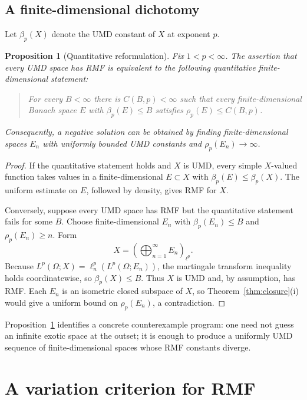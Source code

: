 \documentclass[11pt]{article}
\newtheorem{proposition}[theorem]{Proposition}
\theoremstyle{definition}
\newcommand{\1}{\mathbf 1}
\begin{document}
\subsection{A finite-dimensional dichotomy}

Let $\beta_p(X)$ denote the UMD constant of $X$ at exponent $p$.

\begin{proposition}[Quantitative reformulation]\label{prop:finite-dichotomy}
Fix $1<p<\infty$.  The assertion that every UMD space has RMF is equivalent to
the following quantitative finite-dimensional statement:
\begin{quote}
For every $B<\infty$ there is $C(B,p)<\infty$ such that every
finite-dimensional Banach space $E$ with $\beta_p(E)\le B$ satisfies
$\rho_p(E)\le C(B,p)$.
\end{quote}
Consequently, a negative solution can be obtained by finding finite-dimensional
spaces $E_n$ with uniformly bounded UMD constants and
$\rho_p(E_n)\to\infty$.
\end{proposition}

\begin{proof}
If the quantitative statement holds and $X$ is UMD, every simple $X$-valued
function takes values in a finite-dimensional $E\subset X$ with
$\beta_p(E)\le\beta_p(X)$.  The uniform estimate on $E$, followed by density,
gives RMF for $X$.

Conversely, suppose every UMD space has RMF but the quantitative statement
fails for some $B$.  Choose finite-dimensional $E_n$ with
$\beta_p(E_n)\le B$ and $\rho_p(E_n)\ge n$.  Form
\[
 X=\left(\bigoplus_{n=1}^\infty E_n\right)_{\ell^p}.
\]
Because $L^p(\Omega;X)=\ell^p_n(L^p(\Omega;E_n))$, the martingale transform
inequality holds coordinatewise, so $\beta_p(X)\le B$.  Thus $X$ is UMD and,
by assumption, has RMF.  Each $E_n$ is an isometric closed subspace of $X$, so
Theorem~\ref{thm:closure}(i) would give a uniform bound on $\rho_p(E_n)$, a
contradiction.
\end{proof}

Proposition~\ref{prop:finite-dichotomy} identifies a concrete counterexample
program: one need not guess an infinite exotic space at the outset; it is enough
to produce a uniformly UMD sequence of finite-dimensional spaces whose RMF
constants diverge.

\section{A variation criterion for RMF}
\end{document}
